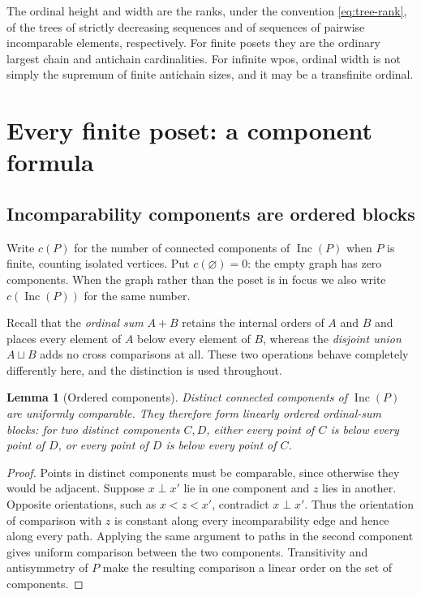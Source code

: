 \documentclass[11pt,letterpaper]{article}
\newtheorem{lemma}[theorem]{Lemma}
\theoremstyle{definition}
\theoremstyle{remark}
\newcommand{\Inc}{\operatorname{Inc}}
\begin{document}
The ordinal height and width are the ranks, under the convention
\eqref{eq:tree-rank}, of the trees of strictly decreasing sequences and of
sequences of pairwise incomparable elements, respectively. For finite posets
they are the ordinary largest chain and antichain cardinalities. For infinite
wpos, ordinal width is not simply the supremum of finite antichain sizes,
and it may be a transfinite ordinal.

\section{Every finite poset: a component formula}\label{sec:finite}

\subsection{Incomparability components are ordered blocks}
Write $c(P)$ for the number of connected components of $\Inc(P)$ when $P$ is
finite, counting isolated vertices. Put $c(\varnothing)=0$: the empty graph
has zero components. When the graph rather than the poset is in focus we also
write $c(\Inc(P))$ for the same number.

Recall that the \emph{ordinal sum} $A+B$ retains the internal orders of $A$
and $B$ and places every element of $A$ below every element of $B$, whereas
the \emph{disjoint union} $A\sqcup B$ adds no cross comparisons at all.
These two operations behave completely differently here, and the distinction
is used throughout.

\begin{lemma}[Ordered components]\label{lem:ordered-components}
Distinct connected components of $\Inc(P)$ are uniformly comparable.
They therefore form linearly ordered ordinal-sum blocks: for two distinct
components $C,D$, either every point of $C$ is below every point of $D$,
or every point of $D$ is below every point of $C$.
\end{lemma}
\begin{proof}
Points in distinct components must be comparable, since otherwise they
would be adjacent. Suppose $x\perp x'$ lie in one component and $z$ lies
in another. Opposite orientations, such as $x<z<x'$, contradict
$x\perp x'$. Thus the orientation of comparison with $z$ is constant
along every incomparability edge and hence along every path. Applying the
same argument to paths in the second component gives uniform comparison
between the two components. Transitivity and antisymmetry of $P$ make the
resulting comparison a linear order on the set of components.
\end{proof}
\end{document}
